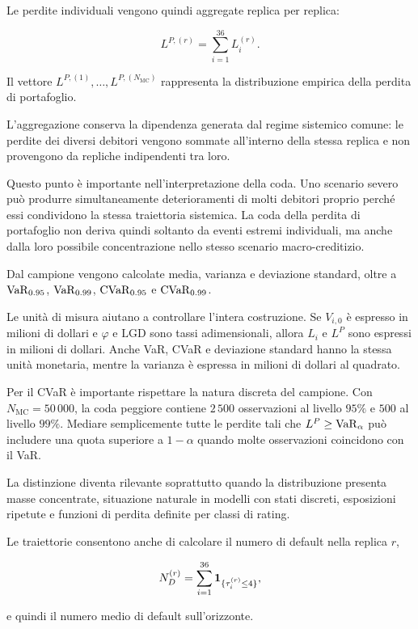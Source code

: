 Le perdite individuali vengono quindi aggregate replica per replica:

\[
L^{P,(r)}
=
\sum_{i=1}^{36}L_i^{(r)}.
\]

Il vettore
$L^{P,(1)},\ldots,L^{P,(N_{\mathrm{MC}})}$ rappresenta la distribuzione
empirica della perdita di portafoglio.

L'aggregazione conserva la dipendenza generata dal regime sistemico comune:
le perdite dei diversi debitori vengono sommate all'interno della stessa
replica e non provengono da repliche indipendenti tra loro.

Questo punto \`e importante nell'interpretazione della coda. Uno scenario
severo pu\`o produrre simultaneamente deterioramenti di molti debitori
proprio perch\'e essi condividono la stessa traiettoria sistemica. La coda
della perdita di portafoglio non deriva quindi soltanto da eventi estremi
individuali, ma anche dalla loro possibile concentrazione nello stesso
scenario macro-creditizio.

Dal campione vengono calcolate media, varianza e deviazione standard, oltre a
$\operatorname{VaR}_{0.95}$, $\operatorname{VaR}_{0.99}$, $\operatorname{CVaR}_{0.95}$ e $\operatorname{CVaR}_{0.99}$.

Le unit\`a di misura aiutano a controllare l'intera costruzione. Se
$V_{i,0}$ \`e espresso in milioni di dollari e $\varphi$ e $\mathrm{LGD}$ sono tassi
adimensionali, allora $L_i$ e $L^P$ sono espressi in milioni di dollari.
Anche VaR, CVaR e deviazione standard hanno la stessa unit\`a monetaria,
mentre la varianza \`e espressa in milioni di dollari al quadrato.

Per il CVaR \`e importante rispettare la natura discreta del campione. Con
$N_{\mathrm{MC}}=50\,000$, la coda peggiore contiene $2\,500$ osservazioni
al livello $95\%$ e $500$ al livello $99\%$. Mediare semplicemente tutte
le perdite tali che $L^P\geq\operatorname{VaR}_\alpha$ pu\`o includere una quota superiore
a $1-\alpha$ quando molte osservazioni coincidono con il VaR.

La distinzione diventa rilevante soprattutto quando la distribuzione presenta
masse concentrate, situazione naturale in modelli con stati discreti,
esposizioni ripetute e funzioni di perdita definite per classi di rating.

Le traiettorie consentono anche di calcolare il numero di default nella
replica $r$,

\[
N_D^{(r)}
=
\sum_{i=1}^{36}
\mathbf{1}_{\{\tau_i^{(r)}\leq4\}},
\]

\noindent e quindi il numero medio di default sull'orizzonte.

